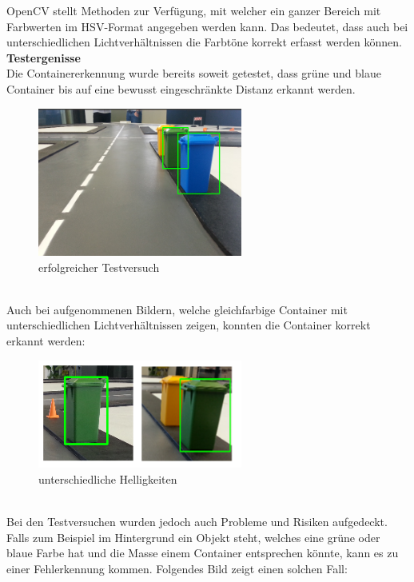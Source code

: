 OpenCV stellt Methoden zur Verfügung, mit welcher ein ganzer Bereich mit Farbwerten im HSV-Format angegeben werden kann. Das bedeutet, dass auch bei unterschiedlichen Lichtverhältnissen die Farbtöne korrekt erfasst werden können.
\\[0.2cm]
\textbf{Testergenisse} \\
Die Containererkennung wurde bereits soweit getestet, dass grüne und blaue Container bis auf eine bewusst eingeschränkte Distanz erkannt werden. 
\begin{figure}[H]%
\centering
\includegraphics[width=0.6\textwidth]{03_Loesungskonzept/pictures/containererkennung_blau_gruen.png}
\caption{erfolgreicher Testversuch}
\label{fig:erfolgreicher Testversuch}
\end{figure}\\
Auch bei aufgenommenen Bildern, welche gleichfarbige Container mit unterschiedlichen Lichtverhältnissen zeigen, konnten die Container korrekt erkannt werden:
\begin{figure}[H]%
\centering
\includegraphics[width=0.6\textwidth]{03_Loesungskonzept/pictures/containererkennung_div_brightness.png}
\caption{unterschiedliche Helligkeiten}
\label{fig:unterschiedliche Helligkeiten}
\end{figure}\\
Bei den Testversuchen wurden jedoch auch Probleme und Risiken aufgedeckt. Falls zum Beispiel im Hintergrund ein Objekt steht, welches eine grüne oder blaue Farbe hat und die Masse einem Container entsprechen könnte, kann es zu einer Fehlerkennung kommen. Folgendes Bild zeigt einen solchen Fall:
